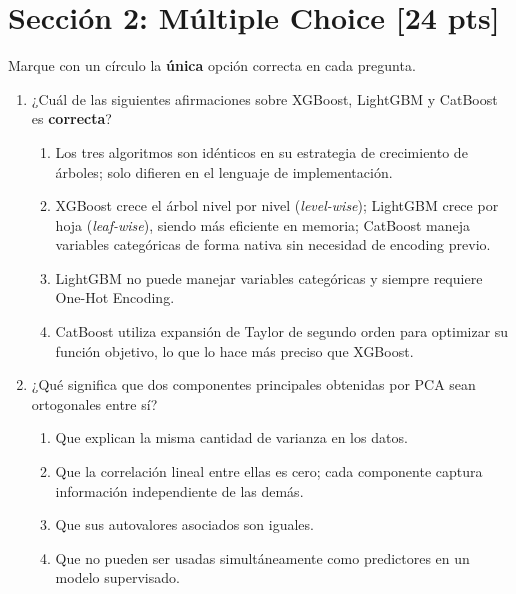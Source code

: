\documentclass[11pt,a4paper]{article}
\newcommand{\puntaje}[1]{\textbf{[#1 pts]}}
\begin{document}
\vspace{0.5cm}

\section*{Secci\'on 2: M\'ultiple Choice \puntaje{24}}

\noindent Marque con un c\'irculo la \textbf{\'unica} opci\'on correcta en cada pregunta.

\vspace{0.3cm}

\begin{enumerate}[label=\textbf{\arabic*.}, leftmargin=*, itemsep=20pt]

\item ¿Cu\'al de las siguientes afirmaciones sobre XGBoost, LightGBM y CatBoost es \textbf{correcta}?

\begin{enumerate}[label=\alph*)]
  \item Los tres algoritmos son id\'enticos en su estrategia de crecimiento de \'arboles; solo difieren en el lenguaje de implementaci\'on.
  \item XGBoost crece el \'arbol nivel por nivel (\textit{level-wise}); LightGBM crece por hoja (\textit{leaf-wise}), siendo m\'as eficiente en memoria; CatBoost maneja variables categ\'oricas de forma nativa sin necesidad de encoding previo.
  \item LightGBM no puede manejar variables categ\'oricas y siempre requiere One-Hot Encoding.
  \item CatBoost utiliza expansi\'on de Taylor de segundo orden para optimizar su funci\'on objetivo, lo que lo hace m\'as preciso que XGBoost.
\end{enumerate}

\item ¿Qu\'e significa que dos componentes principales obtenidas por PCA sean ortogonales entre s\'i?

\begin{enumerate}[label=\alph*)]
  \item Que explican la misma cantidad de varianza en los datos.
  \item Que la correlaci\'on lineal entre ellas es cero; cada componente captura informaci\'on independiente de las dem\'as.
  \item Que sus autovalores asociados son iguales.
  \item Que no pueden ser usadas simult\'aneamente como predictores en un modelo supervisado.
\end{enumerate}


\end{enumerate}
\end{document}
